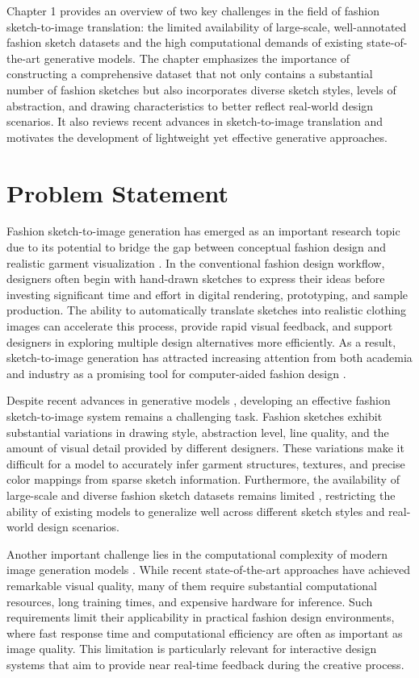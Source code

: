 \documentclass[../main.tex]{subfiles}
\begin{document}
Chapter 1 provides an overview of two key challenges in the field of fashion sketch-to-image translation: the limited availability of large-scale, well-annotated fashion sketch datasets and the high computational demands of existing state-of-the-art generative models. The chapter emphasizes the importance of constructing a comprehensive dataset that not only contains a substantial number of fashion sketches but also incorporates diverse sketch styles, levels of abstraction, and drawing characteristics to better reflect real-world design scenarios. It also reviews recent advances in sketch-to-image translation and motivates the development of lightweight yet effective generative approaches.
\section{Problem Statement}
\label{sec:problem_statement}
Fashion sketch-to-image generation has emerged as an important research topic due to its potential to bridge the gap between conceptual fashion design and realistic garment visualization \cite{cheng2021fashion}. In the conventional fashion design workflow, designers often begin with hand-drawn sketches to express their ideas before investing significant time and effort in digital rendering, prototyping, and sample production. The ability to automatically translate sketches into realistic clothing images can accelerate this process, provide rapid visual feedback, and support designers in exploring multiple design alternatives more efficiently. As a result, sketch-to-image generation has attracted increasing attention from both academia and industry as a promising tool for computer-aided fashion design \cite{isola2017image}.

Despite recent advances in generative models \cite{wang2018high}, developing an effective fashion sketch-to-image system remains a challenging task. Fashion sketches exhibit substantial variations in drawing style, abstraction level, line quality, and the amount of visual detail provided by different designers. These variations make it difficult for a model to accurately infer garment structures, textures, and precise color mappings from sparse sketch information. Furthermore, the availability of large-scale and diverse fashion sketch datasets remains limited \cite{sangkloy2016sketchy}, restricting the ability of existing models to generalize well across different sketch styles and real-world design scenarios.

Another important challenge lies in the computational complexity of modern image generation models \cite{menghani2023efficient}. While recent state-of-the-art approaches have achieved remarkable visual quality, many of them require substantial computational resources, long training times, and expensive hardware for inference. Such requirements limit their applicability in practical fashion design environments, where fast response time and computational efficiency are often as important as image quality. This limitation is particularly relevant for interactive design systems that aim to provide near real-time feedback during the creative process.
\end{document}
